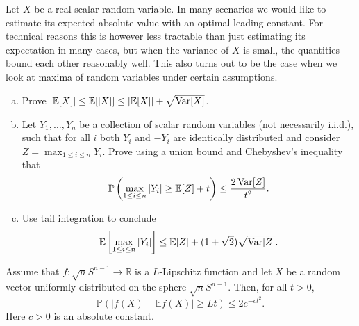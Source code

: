 \begin{myexercise}
    \label{prob:absvaluessmalldifference}
    Let $X$ be a real scalar random variable. In many scenarios we would like to estimate its expected absolute value with an optimal leading constant. For technical reasons this is however less tractable than just estimating its expectation in many cases, but when the variance of $X$ is small, the quantities bound each other reasonably well. This also turns out to be the case when we look at maxima of random variables under certain assumptions.
    \begin{enumerate}[(a)]
        \item Prove $ |\mathbb{E}[X]| \leq \mathbb{E} [|X|] \leq |\mathbb{E}[X]| + \sqrt{\operatorname{Var}[X]}$.
        \item Let $ Y_1, \ldots, Y_n$ be a collection of scalar random variables (not necessarily i.i.d.), such that for all $i$ both $Y_i$ and $-Y_i$ are identically distributed and consider $Z = \max_{1 \leq i \leq n} Y_i$. Prove using a union bound and Chebyshev's inequality that
        $$ \mathbb{P} \left( \max_{1 \leq i \leq n} |Y_i| \geq \mathbb{E}[Z] + t \right) \leq \frac{2\operatorname{Var}[Z]}{t^2}.$$
        \item Use tail integration to conclude 
        $$ \mathbb{E} \left[ \max_{1 \leq i \leq n} |Y_i|  \right]  \leq \mathbb{E}[Z] + (1+ \sqrt{2})\sqrt{\operatorname{Var}[Z]}.$$
        
    \end{enumerate}
    

    
\end{myexercise}



\begin{theorem}
    Assume that $f:\sqrt{n}S^{n-1} \rightarrow \mathbb{R}$ is a $L$-Lipschitz function and let $X$ be a random vector uniformly distributed on the sphere $\sqrt{n}S^{n-1}$. Then, for all $t>0$,
    \begin{equation}\label{conc_sphere}
        \mathbb{P}(|f(X) - \mathbb{E}f(X)| \ge L t)\le 2e^{-ct^2}.
    \end{equation}
    Here $c>0$ is an absolute constant.
\end{theorem}










